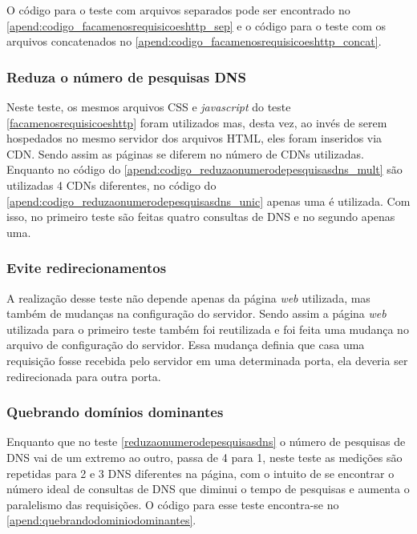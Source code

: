 O código para o teste com arquivos separados pode ser encontrado no \autoref{apend:codigo_facamenosrequisicoeshttp_sep} e o código para o teste com os arquivos concatenados no \autoref{apend:codigo_facamenosrequisicoeshttp_concat}.

\subsubsection{Reduza o número de pesquisas DNS}
\label{reduzaonumerodepesquisasdns}

Neste teste, os mesmos arquivos CSS e \textit{javascript} do teste \ref{facamenosrequisicoeshttp} foram utilizados mas, desta vez, ao invés de serem hospedados no mesmo servidor dos arquivos HTML, eles foram inseridos via CDN. Sendo assim as páginas se diferem no número de CDNs utilizadas. Enquanto no código do \autoref{apend:codigo_reduzaonumerodepesquisasdns_mult} são utilizadas 4 CDNs diferentes, no código do \autoref{apend:codigo_reduzaonumerodepesquisasdns_unic} apenas uma é utilizada. Com isso, no primeiro teste são feitas quatro consultas de DNS e no segundo apenas uma.

\subsubsection{Evite redirecionamentos}
\label{eviteredirecionamentos}

A realização desse teste não depende apenas da página \textit{web} utilizada, mas também de mudanças na configuração do servidor. Sendo assim a página \textit{web} utilizada para o primeiro teste também foi reutilizada e foi feita uma mudança no arquivo de configuração do servidor. Essa mudança definia que casa uma requisição fosse recebida pelo servidor em uma determinada porta, ela deveria ser redirecionada para outra porta.

\subsubsection{Quebrando domínios dominantes}
\label{quebrandodominiosdominantes}

Enquanto que no teste \autoref{reduzaonumerodepesquisasdns} o número de pesquisas de DNS vai de um extremo ao outro, passa de 4 para 1, neste teste as medições são repetidas para 2 e 3 DNS diferentes na página, com o intuito de se encontrar o número ideal de consultas de DNS que diminui o tempo de pesquisas e aumenta o paralelismo das requisições. O código para esse teste encontra-se no \autoref{apend:quebrandodominiodominantes}.

